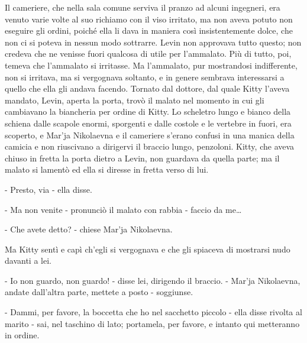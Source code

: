 Il cameriere, che nella sala comune serviva il pranzo ad alcuni ingegneri, era venuto varie volte al suo richiamo con il viso irritato, ma non aveva potuto non eseguire gli ordini, poiché ella li dava in maniera così insistentemente dolce, che non ci si poteva in nessun modo sottrarre. Levin non approvava tutto questo; non credeva che ne venisse fuori qualcosa di utile per l'ammalato. Più di tutto, poi, temeva che l'ammalato si irritasse. Ma l'ammalato, pur mostrandosi indifferente, non si irritava, ma si vergognava soltanto, e in genere sembrava interessarsi a quello che ella gli andava facendo. Tornato dal dottore, dal quale Kitty l'aveva mandato, Levin, aperta la porta, trovò il malato nel momento in cui gli cambiavano la biancheria per ordine di Kitty. Lo scheletro lungo e bianco della schiena dalle scapole enormi, sporgenti e dalle costole e le vertebre in fuori, era scoperto, e Mar'ja Nikolaevna e il cameriere s'erano confusi in una manica della camicia e non riuscivano a dirigervi il braccio lungo, penzoloni. Kitty, che aveva chiuso in fretta la porta dietro a Levin, non guardava da quella parte; ma il malato si lamentò ed ella si diresse in fretta verso di lui. 

- Presto, via - ella disse. 

- Ma non venite - pronunciò il malato con rabbia - faccio da me\ldots{} 

- Che avete detto? - chiese Mar'ja Nikolaevna. 

Ma Kitty sentì e capì ch'egli si vergognava e che gli spiaceva di mostrarsi nudo davanti a lei. 

- Io non guardo, non guardo! - disse lei, dirigendo il braccio. - Mar'ja Nikolaevna, andate dall'altra parte, mettete a posto - soggiunse. 

- Dammi, per favore, la boccetta che ho nel sacchetto piccolo - ella disse rivolta al marito - sai, nel taschino di lato; portamela, per favore, e intanto qui metteranno in ordine. 

